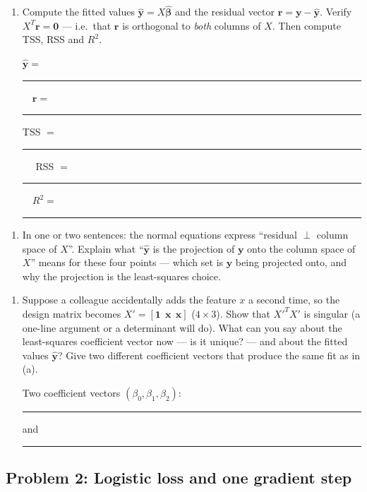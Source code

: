 \documentclass[
  11pt,
]{article}
\providecommand{\tightlist}{%
  \setlength{\itemsep}{0pt}\setlength{\parskip}{0pt}}
\newcommand{\answerspace}[1]{\par\vspace*{#1}}  %
\newcommand{\blank}[1][1.2in]{\rule{#1}{0.4pt}}
\newcommand{\answerpage}{\clearpage}
\begin{document}
\answerspace{3in}

\begin{enumerate}
\def\labelenumi{(\alph{enumi})}
\setcounter{enumi}{1}
\item
  Compute the fitted values
  \(\hat{\mathbf y} = X\hat{\boldsymbol\beta}\) and the residual vector
  \(\mathbf r = \mathbf y - \hat{\mathbf y}\). Verify
  \(X^T\mathbf r = \mathbf 0\) --- i.e.~that \(\mathbf r\) is orthogonal
  to \emph{both} columns of \(X\). Then compute TSS, RSS and \(R^2\).

  \(\hat{\mathbf y} =\) \blank[2in] \(\quad \mathbf r =\)
  \blank[1.8in]TSS \(=\) \blank[0.8in] \(\quad\) RSS \(=\)
  \blank[0.8in] \(\quad R^2 =\) \blank[0.8in]
\end{enumerate}

\answerspace{2.5in}

\begin{enumerate}
\def\labelenumi{(\alph{enumi})}
\setcounter{enumi}{2}
\tightlist
\item
  In one or two sentences: the normal equations express ``residual
  \(\perp\) column space of \(X\)''. Explain what ``\(\hat{\mathbf y}\)
  is the projection of \(\mathbf y\) onto the column space of \(X\)''
  means for these four points --- which set is \(\mathbf y\) being
  projected onto, and why the projection is the least-squares choice.
\end{enumerate}

\answerspace{2.5in}

\begin{enumerate}
\def\labelenumi{(\alph{enumi})}
\setcounter{enumi}{3}
\item
  Suppose a colleague accidentally adds the feature \(x\) a second time,
  so the design matrix becomes
  \(X' = [\mathbf 1\ \ \mathbf x\ \ \mathbf x]\) (\(4\times3\)). Show
  that \(X'^TX'\) is singular (a one-line argument or a determinant will
  do). What can you say about the least-squares coefficient vector now
  --- is it unique? --- and about the fitted values \(\hat{\mathbf y}\)?
  Give two different coefficient vectors that produce the same fit as in
  (a).

  Two coefficient vectors \((\beta_0, \beta_1, \beta_2)\):
  \blank[1.5in] and \blank[1.5in]
\end{enumerate}

\answerspace{2.5in}

\answerpage

\subsection{Problem 2: Logistic loss and one gradient
step}\label{problem-2-logistic-loss-and-one-gradient-step}
\end{document}
